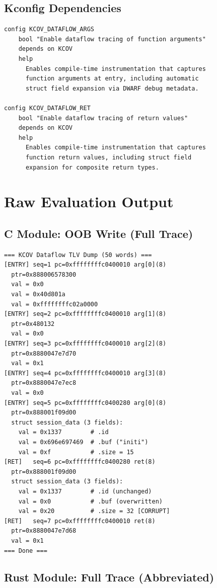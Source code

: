 \documentclass{ndss}
\begin{document}
\subsection{Kconfig Dependencies}

\begin{lstlisting}[numbers=none]
config KCOV_DATAFLOW_ARGS
    bool "Enable dataflow tracing of function arguments"
    depends on KCOV
    help
      Enables compile-time instrumentation that captures
      function arguments at entry, including automatic
      struct field expansion via DWARF debug metadata.

config KCOV_DATAFLOW_RET
    bool "Enable dataflow tracing of return values"
    depends on KCOV
    help
      Enables compile-time instrumentation that captures
      function return values, including struct field
      expansion for composite return types.
\end{lstlisting}

\section{Raw Evaluation Output}\label{app:raw}

\subsection{C Module: OOB Write (Full Trace)}

\begin{lstlisting}[numbers=none]
=== KCOV Dataflow TLV Dump (50 words) ===
[ENTRY] seq=1 pc=0xffffffffc0400010 arg[0](8)
  ptr=0x888006578300
  val = 0x0
  val = 0x40d801a
  val = 0xffffffffc02a0000
[ENTRY] seq=2 pc=0xffffffffc0400010 arg[1](8)
  ptr=0x480132
  val = 0x0
[ENTRY] seq=3 pc=0xffffffffc0400010 arg[2](8)
  ptr=0x8880047e7d70
  val = 0x1
[ENTRY] seq=4 pc=0xffffffffc0400010 arg[3](8)
  ptr=0x8880047e7ec8
  val = 0x0
[ENTRY] seq=5 pc=0xffffffffc0400280 arg[0](8)
  ptr=0x888001f09d00
  struct session_data (3 fields):
    val = 0x1337        # .id
    val = 0x696e697469  # .buf ("initi")
    val = 0xf           # .size = 15
[RET]   seq=6 pc=0xffffffffc0400280 ret(8)
  ptr=0x888001f09d00
  struct session_data (3 fields):
    val = 0x1337        # .id (unchanged)
    val = 0x0           # .buf (overwritten)
    val = 0x20          # .size = 32 [CORRUPT]
[RET]   seq=7 pc=0xffffffffc0400010 ret(8)
  ptr=0x8880047e7d68
  val = 0x1
=== Done ===
\end{lstlisting}

\subsection{Rust Module: Full Trace (Abbreviated)}
\end{document}
